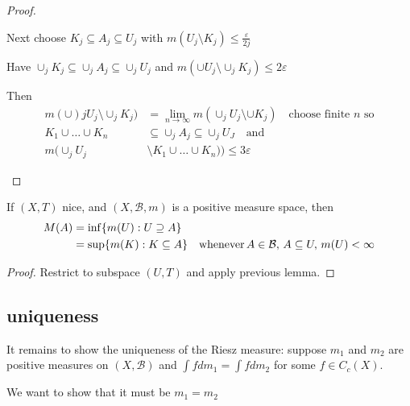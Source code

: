 \begin{proof}
\begin{enumerate}
	Next choose $K_j \subseteq A_j \subseteq U_j$ with  $m(U_j \setminus K_j) \leq \frac{\varepsilon}{2j}$ 

	Have $\cup_j K_j \subseteq \cup_j A_j \subseteq \cup_j U_j$ and  $m(\cup U_j \setminus \cup_j K_j ) \leq 2 \varepsilon$ 

	Then 
	\begin{align*}
		m( \cup)j U_j \setminus \cup_j K_j) &= \lim_{n \to \infty} m ( \cup_j U_j \setminus \cup K_j) \quad \text{choose finite $n$ so} \\
		K_1 \cup \ldots \cup K_n &\subseteq \cup_j A_j \subseteq \cup_j U_J \quad \text{and} \\
		m(\cup_j U_j &\setminus K_1 \cup \ldots \cup K_n )) \leq 3\varepsilon
	\end{align*} 
\end{enumerate}

\end{proof}

\begin{lemma}
	If $(X, T)$ nice, and $(X,\mathcal{B}, m)$ is a positive measure space, then
	\begin{align*}
		M(A) &= \inf\{m(U) : U \supseteq A\} \\
			 &= \sup \{m(K) : K \subseteq A \} \quad \text{whenever} \, A \in \mathcal{B},
			 \, A \subseteq U, \, m(U) < \infty
	\end{align*}
\end{lemma}

\begin{proof}
	Restrict to subspace $(U,T)$ and apply previous lemma.
\end{proof}

\subsection{uniqueness}
It remains to show the uniqueness of the Riesz measure: suppose $m_1$ and $m_2$ are positive measures on $(X,\mathcal{B})$ and $\int f dm_1 = \int f dm_2$ for some  $f \in C_c(X)$.


We want to show that it must be  $m_1 = m_2$

